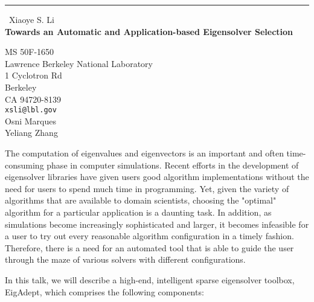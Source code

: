 \documentclass{report}
\begin{document}
\begin{center}
\rule{6in}{1pt} \
{\large Xiaoye S. Li \\
{\bf Towards an Automatic and Application-based Eigensolver Selection}}

MS 50F-1650 \\ Lawrence Berkeley National Laboratory \\ 1 Cyclotron Rd \\ Berkeley \\ CA 94720-8139
\\
{\tt xsli@lbl.gov}\\
Osni Marques\\
Yeliang Zhang\end{center}

The computation of eigenvalues and eigenvectors is an important and often
time-consuming phase in computer simulations. Recent efforts in the
development of eigensolver libraries have given users good algorithm
implementations without the need for users to spend much time in programming.
Yet, given the variety of algorithms that are available to domain scientists,
choosing the "optimal" algorithm for a particular application is a daunting
task. In addition, as simulations become increasingly sophisticated and larger,
it becomes infeasible for a user to try out every reasonable algorithm
configuration in a timely fashion. Therefore, there is a need for an
automated tool that is able to guide the user through the maze of various
solvers with different configurations.

In this talk, we will describe a high-end, intelligent sparse eigensolver
toolbox, EigAdept, which comprises the following components:
\end{document}
